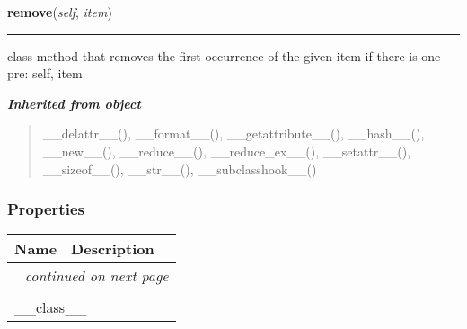     \label{coinor:blimpy:LinkedList':LinkedList:remove}

    \vspace{0.5ex}

\hspace{.8\funcindent}\begin{boxedminipage}{\funcwidth}

    \raggedright \textbf{remove}(\textit{self}, \textit{item})

    \vspace{-1.5ex}

    \rule{\textwidth}{0.5\fboxrule}
\setlength{\parskip}{2ex}
    class method that removes the first occurrence of the given item if 
    there is one pre: self, item

\setlength{\parskip}{1ex}
    \end{boxedminipage}


\large{\textbf{\textit{Inherited from object}}}

\begin{quote}
\_\_delattr\_\_(), \_\_format\_\_(), \_\_getattribute\_\_(), \_\_hash\_\_(), \_\_new\_\_(), \_\_reduce\_\_(), \_\_reduce\_ex\_\_(), \_\_setattr\_\_(), \_\_sizeof\_\_(), \_\_str\_\_(), \_\_subclasshook\_\_()
\end{quote}


  \subsubsection{Properties}

    \vspace{-1cm}
\hspace{\varindent}\begin{longtable}{|p{\varnamewidth}|p{\vardescrwidth}|l}
\cline{1-2}
\cline{1-2} \centering \textbf{Name} & \centering \textbf{Description}& \\
\cline{1-2}
\endhead\cline{1-2}\multicolumn{3}{r}{\small\textit{continued on next page}}\\\endfoot\cline{1-2}
\endlastfoot\multicolumn{2}{|l|}{\textit{Inherited from object}}\\
\multicolumn{2}{|p{\varwidth}|}{\raggedright \_\_class\_\_}\\
\cline{1-2}
\end{longtable}

